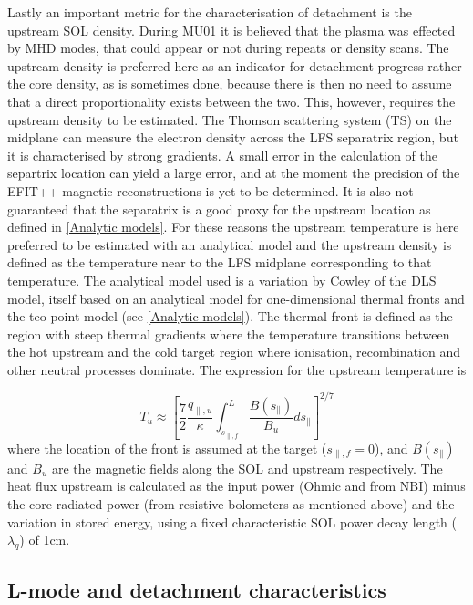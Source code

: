 Lastly an important metric for the characterisation of detachment is the upstream SOL density. During MU01 it is believed that the plasma was effected by MHD modes, that could appear or not during repeats or density scans. The upstream density is preferred here as an indicator for detachment progress rather the core density, as is sometimes done, because there is then no need to assume that a direct proportionality exists between the two. This, however, requires the upstream density to be estimated. The Thomson scattering system (TS) on the midplane can measure the electron density across the LFS separatrix region, but it is characterised by strong gradients. A small error in the calculation of the separtrix location can yield a large error, and at the moment the precision of the EFIT++ magnetic reconstructions is yet to be determined. It is also not guaranteed that the separatrix is a good proxy for the upstream location as defined in \autoref{Analytic models}. For these reasons the upstream temperature is here preferred to be estimated with an analytical model and the upstream density is defined as the temperature near to the LFS midplane corresponding to that temperature. The analytical model used is a variation by Cowley\cite{Cowley2022} of the DLS model\cite{Lipschultz2016}, itself based on an analytical model for one-dimensional thermal fronts\cite{Hutchinson1994} and the teo point model (see \autoref{Analytic models}). The thermal front is defined as the region with steep thermal gradients where the temperature transitions between the hot upstream and the cold target region where ionisation, recombination and other neutral processes dominate. The expression for the upstream temperature is\cite{Cowley2022}

\begin{equation}
T_u \approx \left [ \frac{7}{2} \frac{q_{\parallel,u}}{\kappa} \int_{s_{\parallel,f}}^{L} \frac{B(s_{\parallel})}{B_u} ds_{\parallel} \right ]^{2/7}
\label{eq:thomo1}
\end{equation}
where the location of the front is assumed at the target ($s_{\parallel,f}=0$), and $B(s_{\parallel})$ and ${B_u}$ are the magnetic fields along the SOL and upstream respectively. The heat flux upstream is calculated as the input power (Ohmic and from NBI) minus the core radiated power (from resistive bolometers as mentioned above) and the variation in stored energy, using a fixed characteristic SOL power decay length ($\lambda_q$) of 1cm.

\subsection{L-mode and detachment characteristics}

